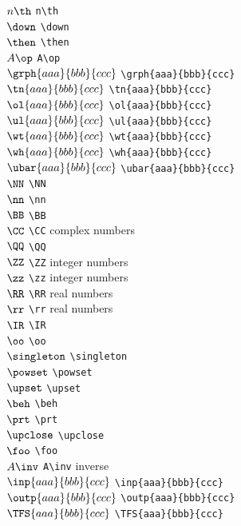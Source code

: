 \documentclass[11pt, book]{memoir}
\begin{document}
\begin{multicols}{2}
$n\th$ \verb|n\th| \\
$\down$ \verb|\down| \\
$\then$ \verb|\then| \\
$A\op$ \verb|A\op| \\
$\grph{aaa}{bbb}{ccc}$ \verb|\grph{aaa}{bbb}{ccc}| \\
$\tn{aaa}{bbb}{ccc}$ \verb|\tn{aaa}{bbb}{ccc}| \\
$\ol{aaa}{bbb}{ccc}$ \verb|\ol{aaa}{bbb}{ccc}| \\
$\ul{aaa}{bbb}{ccc}$ \verb|\ul{aaa}{bbb}{ccc}| \\
$\wt{aaa}{bbb}{ccc}$ \verb|\wt{aaa}{bbb}{ccc}| \\
$\wh{aaa}{bbb}{ccc}$ \verb|\wh{aaa}{bbb}{ccc}| \\
$\ubar{aaa}{bbb}{ccc}$ \verb|\ubar{aaa}{bbb}{ccc}| \\
$\NN$ \verb|\NN| \\
$\nn$ \verb|\nn| \\
$\BB$ \verb|\BB| \\
$\CC$ \verb|\CC| complex numbers \\
$\QQ$ \verb|\QQ| \\
$\ZZ$ \verb|\ZZ| integer numbers \\
$\zz$ \verb|\zz| integer numbers \\
$\RR$ \verb|\RR| real numbers \\
$\rr$ \verb|\rr| real numbers \\
$\IR$ \verb|\IR| \\
$\oo$ \verb|\oo| \\
$\singleton$ \verb|\singleton| \\
$\powset$ \verb|\powset| \\
$\upset$ \verb|\upset| \\
$\beh$ \verb|\beh| \\
$\prt$ \verb|\prt| \\
$\upclose$ \verb|\upclose| \\
$\foo$ \verb|\foo| \\
$A\inv$ \verb|A\inv| inverse \\
$\inp{aaa}{bbb}{ccc}$ \verb|\inp{aaa}{bbb}{ccc}| \\
$\outp{aaa}{bbb}{ccc}$ \verb|\outp{aaa}{bbb}{ccc}| \\
$\TFS{aaa}{bbb}{ccc}$ \verb|\TFS{aaa}{bbb}{ccc}| \\

\end{multicols}
\end{document}
